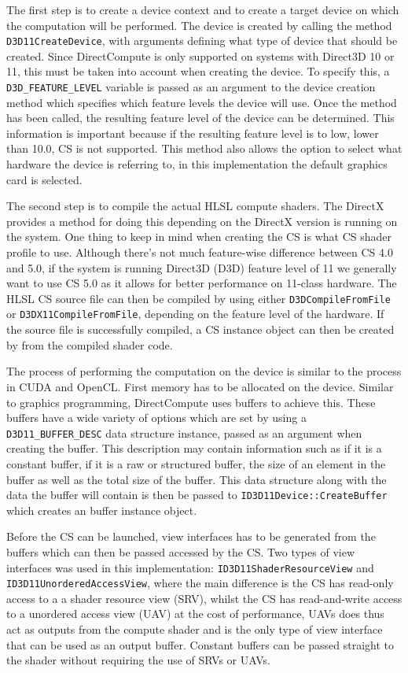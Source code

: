 The first step is to create a device context and to create a target device on which the computation will be performed.
The device is created by calling the method \lstinline{D3D11CreateDevice}, with arguments defining what type of device that should be created. Since DirectCompute is only supported on systems with Direct3D 10 or 11, this must be taken into account when creating the device. To specify this, a \lstinline{D3D_FEATURE_LEVEL} variable is passed as an argument to the device creation method which specifies which feature levels the device will use. Once the method has been called, the resulting feature level of the device can be determined. This information is important because if the resulting feature level is to low, lower than 10.0, CS is not supported. This method also allows the option to select what hardware the device is referring to, in this implementation the default graphics card is selected.

The second step is to compile the actual HLSL compute shaders. The DirectX provides a method for doing this depending on the DirectX version is running on the system. One thing to keep in mind when creating the CS is what CS shader profile to use. Although there's not much feature-wise difference between CS 4.0 and 5.0, if the system is running Direct3D (D3D) feature level of 11 we generally want to use CS 5.0 as it allows for better performance on 11-class hardware. The HLSL CS source file can then be compiled by using either \lstinline{D3DCompileFromFile} or \lstinline{D3DX11CompileFromFile}, depending on the feature level of the hardware. If the source file is successfully compiled, a CS instance object can then be created by from the compiled shader code.

The process of performing the computation on the device is similar to the process in CUDA and OpenCL. First memory has to be allocated on the device. Similar to graphics programming, DirectCompute uses buffers to achieve this. These buffers have a wide variety of options which are set by using a \lstinline{D3D11_BUFFER_DESC} data structure instance, passed as an argument when creating the buffer. This description may contain information such as if it is a constant buffer, if it is a raw or structured buffer, the size of an element in the buffer as well as the total size of the buffer. This data structure along with the data the buffer will contain is then be passed to \lstinline{ID3D11Device::CreateBuffer} which creates an buffer instance object. 

Before the CS can be launched, view interfaces has to be generated from the buffers which can then be passed accessed by the CS. Two types of view interfaces was used in this implementation: \lstinline{ID3D11ShaderResourceView} and \lstinline{ID3D11UnorderedAccessView}, where the main difference is the CS has read-only access to a a shader resource view (SRV), whilst the CS has read-and-write access to a unordered access view (UAV) at the cost of performance, UAVs does thus act as outputs from the compute shader and is the only type of view interface that can be used as an output buffer. Constant buffers can be passed straight to the shader without requiring the use of SRVs or UAVs.

